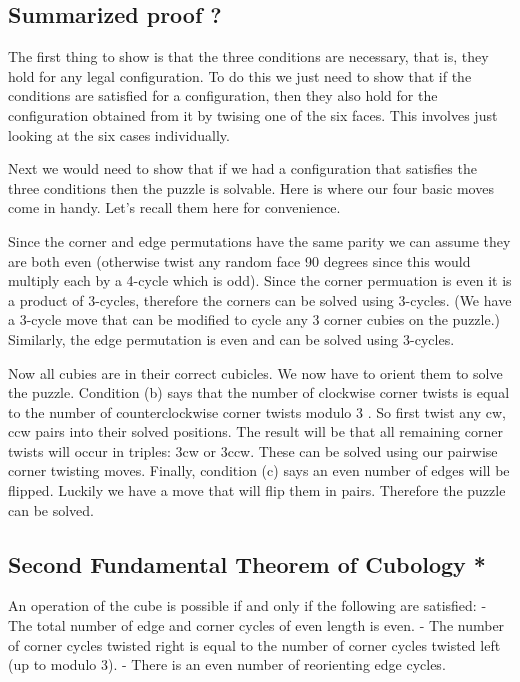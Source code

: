 \subsection{Summarized proof ?}\label{summarized-proof}

The first thing to show is that the three conditions are necessary, that
is, they hold for any legal configuration. To do this we just need to
show that if the conditions are satisfied for a configuration, then they
also hold for the configuration obtained from it by twising one of the
six faces. This involves just looking at the six cases individually.

Next we would need to show that if we had a configuration that satisfies
the three conditions then the puzzle is solvable. Here is where our four
basic moves come in handy. Let's recall them here for convenience.

Since the corner and edge permutations have the same parity we can
assume they are both even (otherwise twist any random face 90 degrees
since this would multiply each by a 4-cycle which is odd). Since the
corner permuation is even it is a product of 3-cycles, therefore the
corners can be solved using 3-cycles. (We have a 3-cycle move that can
be modified to cycle any 3 corner cubies on the puzzle.) Similarly, the
edge permutation is even and can be solved using 3-cycles.

Now all cubies are in their correct cubicles. We now have to orient them
to solve the puzzle. Condition (b) says that the number of clockwise
corner twists is equal to the number of counterclockwise corner twists
modulo 3 . So first twist any cw, ccw pairs into their solved positions.
The result will be that all remaining corner twists will occur in
triples: 3cw or 3ccw. These can be solved using our pairwise corner
twisting moves. Finally, condition (c) says an even number of edges will
be flipped. Luckily we have a move that will flip them in pairs.
Therefore the puzzle can be solved.

\subsection{Second Fundamental Theorem of Cubology
*}\label{second-fundamental-theorem-of-cubology}

An operation of the cube is possible if and only if the following are
satisfied: - The total number of edge and corner cycles of even length
is even. - The number of corner cycles twisted right is equal to the
number of corner cycles twisted left (up to modulo 3). - There is an
even number of reorienting edge cycles.

